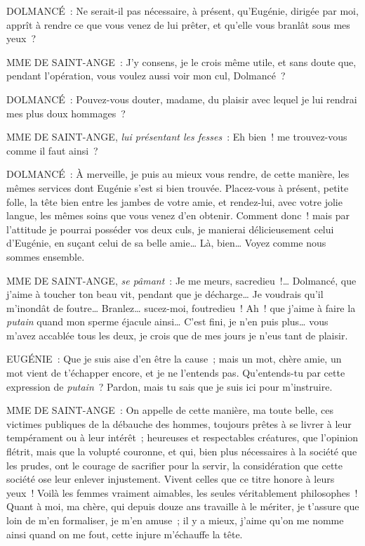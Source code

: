 \documentclass[french,twoside]{book} %
\begin{document}
DOLMANCÉ : Ne serait-il pas nécessaire, à présent, qu’Eugénie, dirigée par moi, apprît à rendre ce que vous venez de lui prêter, et qu’elle vous branlât sous mes yeux ?\par
MME DE SAINT-ANGE : J’y consens, je le crois même utile, et sans doute que, pendant l’opération, vous voulez aussi voir mon cul, Dolmancé ?\par
DOLMANCÉ : Pouvez-vous douter, madame, du plaisir avec lequel je lui rendrai mes plus doux hommages ?\par
MME DE SAINT-ANGE, {\itshape lui présentant les fesses} : Eh bien ! me trouvez-vous comme il faut ainsi ?\par
DOLMANCÉ : À merveille, je puis au mieux vous rendre, de cette manière, les mêmes services dont Eugénie s’est si bien trouvée. Placez-vous à présent, petite folle, la tête bien entre les jambes de votre amie, et rendez-lui, avec votre jolie langue, les mêmes soins que vous venez d’en obtenir. Comment donc ! mais par l’attitude je pourrai posséder vos deux culs, je manierai délicieusement celui d’Eugénie, en suçant celui de sa belle amie… Là, bien… Voyez comme nous sommes ensemble.\par
MME DE SAINT-ANGE, {\itshape se pâmant} : Je me meurs, sacredieu !… Dolmancé, que j’aime à toucher ton beau vit, pendant que je décharge… Je voudrais qu’il m’inondât de foutre… Branlez… sucez-moi, foutredieu ! Ah ! que j’aime à faire la {\itshape putain} quand mon sperme éjacule ainsi… C’est fini, je n’en puis plus… vous m’avez accablée tous les deux, je crois que de mes jours je n’eus tant de plaisir.\par
EUGÉNIE : Que je suis aise d’en être la cause ; mais un mot, chère amie, un mot vient de t’échapper encore, et je ne l’entends pas. Qu’entends-tu par cette expression de {\itshape putain} ? Pardon, mais tu sais que je suis ici pour m’instruire.\par
MME DE SAINT-ANGE : On appelle de cette manière, ma toute belle, ces victimes publiques de la débauche des hommes, toujours prêtes à se livrer à leur tempérament ou à leur intérêt ; heureuses et respectables créatures, que l’opinion flétrit, mais que la volupté couronne, et qui, bien plus nécessaires à la société que les prudes, ont le courage de sacrifier pour la servir, la considération que cette société ose leur enlever injustement. Vivent celles que ce titre honore à leurs yeux ! Voilà les femmes vraiment aimables, les seules véritablement philosophes ! Quant à moi, ma chère, qui depuis douze ans travaille à le mériter, je t’assure que loin de m’en formaliser, je m’en amuse ; il y a mieux, j’aime qu’on me nomme ainsi quand on me fout, cette injure m’échauffe la tête.\par
\end{document}
